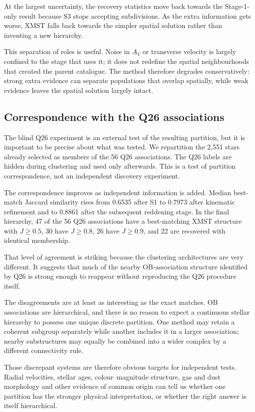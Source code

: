 \documentclass[fleqn,usenatbib]{rasti}
\begin{document}
At the largest uncertainty, the recovery statistics move back towards the Stage-1-only result because S3 stops accepting subdivisions. As the extra information gets worse, XMST falls back towards the simpler spatial solution rather than inventing a new hierarchy.

This separation of roles is useful. Noise in $A_V$ or transverse velocity is largely confined to the stage that uses it; it does not redefine the spatial neighbourhoods that created the parent catalogue. The method therefore degrades conservatively: strong extra evidence can separate populations that overlap spatially, while weak evidence leaves the spatial solution largely intact.

\subsection{Correspondence with the Q26 associations}

The blind Q26 experiment is an external test of the resulting partition, but it is important to be precise about what was tested. We repartition the 2,551 stars already selected as members of the 56 Q26 associations. The Q26 labels are hidden during clustering and used only afterwards. This is a test of partition correspondence, not an independent discovery experiment.

The correspondence improves as independent information is added. Median best-match Jaccard similarity rises from 0.6535 after S1 to 0.7973 after kinematic refinement and to 0.8861 after the subsequent reddening stage. In the final hierarchy, 47 of the 56 Q26 associations have a best-matching XMST structure with $J\geq0.5$, 30 have $J\geq0.8$, 26 have $J\geq0.9$, and 22 are recovered with identical membership.

That level of agreement is striking because the clustering architectures are very different. It suggests that much of the nearby OB-association structure identified by Q26 is strong enough to reappear without reproducing the Q26 procedure itself.

The disagreements are at least as interesting as the exact matches. OB associations are hierarchical, and there is no reason to expect a continuous stellar hierarchy to possess one unique discrete partition. One method may retain a coherent subgroup separately while another includes it in a larger association; nearby substructures may equally be combined into a wider complex by a different connectivity rule.

Those discrepant systems are therefore obvious targets for independent tests. Radial velocities, stellar ages, colour--magnitude structure, gas and dust morphology and other evidence of common origin can tell us whether one partition has the stronger physical interpretation, or whether the right answer is itself hierarchical.
\end{document}
